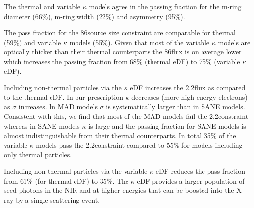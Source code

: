 
The thermal and variable $\kappa$ models agree in the passing fraction for the m-ring diameter (66\%), m-ring width (22\%) and asymmetry (95\%).


The pass fraction for the 86\GHz source size constraint are comparable for thermal (59\%) and variable $\kappa$ models (55\%).
Given that most of the variable $\kappa$ models are optically thicker than their thermal counterparts the 86\GHz flux is on average lower which increases the passing fraction from 68\% (thermal eDF) to 75\% (variable $\kappa$ eDF).


Including non-thermal particles via the $\kappa$ eDF increases the 2.2\um flux as compared to the thermal eDF.  In our prescription $\kappa$ decreases (more high energy electrons) as $\sigma$ increases.  In MAD models $\sigma$ is systematically larger than in SANE models.  Consistent with this, we find that most of the MAD models fail the 2.2\um constraint whereas in SANE models $\kappa$ is large and the passing fraction for SANE models is almost indistinguishable from their thermal counterparts.  
In total 35\% of the variable $\kappa$ models pass the 2.2\um constraint compared to 55\% for models including only thermal particles.


Including non-thermal particles via the variable $\kappa$ eDF reduces the pass fraction from 61\% (for thermal eDF) to 35\%.  The $\kappa$ eDF provides a larger population of seed photons in the NIR and at higher energies that can be boosted into the X-ray by a single scattering event.  

